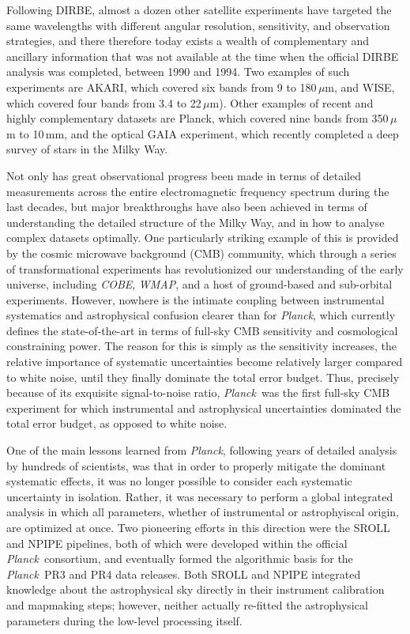 \documentclass{aa}
\def\Planck{\textit{Planck}}
\def\WMAP{\textit{WMAP}}
\def\COBE{\textit{COBE}}
\begin{document}
Following DIRBE, almost a dozen other satellite experiments have targeted the same wavelengths with different angular resolution, sensitivity, and observation strategies, and there therefore today exists a wealth of complementary and ancillary information that was not available at the time when the official DIRBE analysis was completed, between 1990 and 1994. Two examples of such experiments are AKARI, which covered six bands from 9 to 180\,$\mu$m, and WISE, which covered four bands from 3.4 to 22\,$\mu$m). Other examples of recent and highly complementary datasets are Planck, which covered nine bands from 350\,$\mu$m to 10\,mm, and the optical GAIA experiment, which recently completed a deep survey of stars in the Milky Way.

Not only has great observational progress been made in terms of detailed measurements across the entire electromagnetic frequency spectrum during the last decades, but major breakthroughs have also been achieved in terms of understanding the detailed structure of the Milky Way, and in how to analyse complex datasets optimally. One particularly striking example of this is provided by the cosmic microwave background (CMB) community, which through a series of transformational experiments has revolutionized our understanding of the early universe, including \COBE, \WMAP, and a host of ground-based and sub-orbital experiments. However, nowhere is the intimate coupling between instrumental systematics and astrophysical confusion clearer than for  \Planck, which currently defines the state-of-the-art in terms of full-sky CMB sensitivity and cosmological constraining power. The reason for this is simply as the sensitivity increases, the relative importance of systematic uncertainties become relatively larger compared to white noise, until they finally dominate the total error budget. Thus, precisely because of its exquisite signal-to-noise ratio, \Planck\ was the first full-sky CMB experiment for which instrumental and astrophysical uncertainties dominated the total error budget, as opposed to white noise.


One of the main lessons learned from \Planck, following years of detailed analysis by hundreds of scientists, was that in order to properly mitigate the dominant systematic effects, it was no longer possible to consider each systematic uncertainty in isolation. Rather, it was necessary to perform a global integrated analysis in which all parameters, whether of instrumental or astrophyiscal origin, are optimized at once. Two pioneering efforts in this direction were the SROLL and NPIPE pipelines, both of which were developed within the official \Planck\ consortium, and eventually formed the algorithmic basis for the \Planck\ PR3 and PR4 data releases. Both SROLL and NPIPE integrated knowledge about the astrophysical sky directly in their instrument calibration and mapmaking steps; however, neither actually re-fitted the astrophysical parameters during the low-level processing itself.
\end{document}
